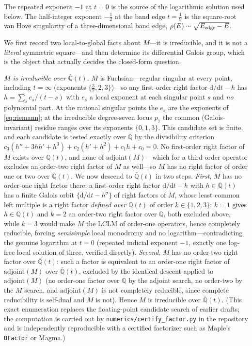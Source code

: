 \documentclass[11pt]{article}
\theoremstyle{plain}
\theoremstyle{remark}
\begin{document}
The repeated exponent $-1$ at $t=0$ is the source of the logarithmic solution used
below. The half-integer exponent $-\tfrac12$ at the band edge $t=\tfrac19$ is the square-root van Hove singularity
of a three-dimensional band edge, $\rho(E)\sim\sqrt{E_{\rm edge}-E}$.

We first record two local-to-global facts about $M$---it is irreducible, and it is not a \emph{literal} symmetric
square---and then determine its differential Galois group, which is the object that actually decides the closed-form
question.

\emph{$M$ is irreducible over $\overline{\mathbb{Q}}(t)$.} $M$ is Fuchsian---regular singular at every point,
including $t=\infty$ (exponents $\{\tfrac32,2,3\}$)---so any first-order right factor $\mathrm{d}/\mathrm{d}t-h$
has $h=\sum_s e_s/(t-s)$ with $e_s$ a local exponent at each singular point $s$ and \emph{no} polynomial part. At
the rational singular points the $e_s$ are the exponents of \eqref{eq:riemann}; at the irreducible degree-seven
locus $p_7$ the common (Galois-invariant) residue ranges over its exponents $\{0,1,3\}$. This candidate set is
finite, and each candidate is tested exactly over $\mathbb{Q}$ by the
divisibility criterion $c_3(h''+3hh'+h^3)+c_2(h'+h^2)+c_1h+c_0=0$. No first-order right factor of $M$ exists over
$\mathbb{Q}(t)$, and none of $\mathrm{adjoint}(M)$---which for a third-order operator excludes an order-two right
factor of $M$ as well---so $M$ has no right factor of order one or two over $\mathbb{Q}(t)$. We now descend to
$\overline{\mathbb{Q}}(t)$ in two steps. \emph{First}, $M$ has no order-one right factor there: a first-order right factor
$\mathrm{d}/\mathrm{d}t-h$ with $h\in\overline{\mathbb{Q}}(t)$ has a finite Galois orbit
$\{\mathrm{d}/\mathrm{d}t-h^\sigma\}$ of right factors of $M$, whose least common left multiple is a right factor
\emph{defined over $\mathbb{Q}(t)$} of order $k\in\{1,2,3\}$; $k=1$ gives $h\in\mathbb{Q}(t)$ and $k=2$ an
order-two right factor over $\mathbb{Q}$, both excluded above, while $k=3$ would make $M$ the LCLM of order-one
operators, hence completely reducible, forcing \emph{semisimple} local monodromy and no logarithm---contradicting
the genuine logarithm at $t=0$ (repeated indicial exponent $-1$, exactly one log-free local solution of three,
verified directly). \emph{Second}, $M$ has no order-two right factor over $\overline{\mathbb{Q}}(t)$: such a factor
is equivalent to an order-one right factor of $\mathrm{adjoint}(M)$ over $\overline{\mathbb{Q}}(t)$, excluded by the
identical descent applied to $\mathrm{adjoint}(M)$ (no order-one factor over $\mathbb{Q}$ by the adjoint search, no
order-two by the $M$ search, and $\mathrm{adjoint}(M)$ is not completely reducible, since complete reducibility is
self-dual and $M$ is not). Hence $M$ is irreducible over $\overline{\mathbb{Q}}(t)$.
(This exact enumeration replaces the floating-point candidate search of earlier drafts; the computation is carried
out by \texttt{numerics/certify\_factor.py} in the repository and is independently reproducible with a certified
factorizer such as Maple's \texttt{DFactor} or Magma.)
\end{document}
